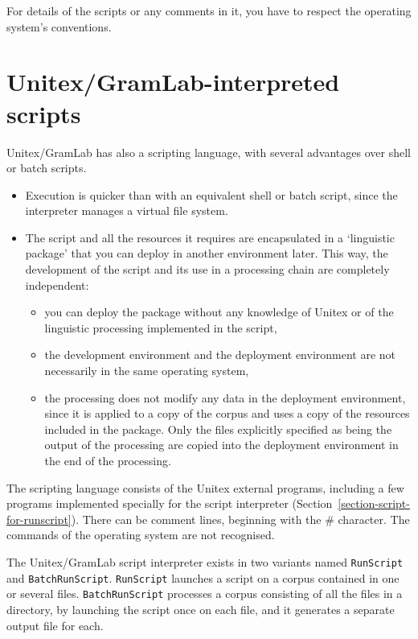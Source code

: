 \noindent For details of the scripts or any comments in it, you have to respect the operating system's
 conventions.



\section{Unitex/GramLab-interpreted scripts}
\label{section-unitex-scripts}

Unitex/GramLab has also a scripting language, with several advantages over shell or batch
scripts.
\begin{itemize}
    \item Execution is quicker than with an equivalent shell or batch script, since the interpreter manages a
virtual file system.
    \item The script and all the resources it requires are encapsulated in a `linguistic package'
    that you can deploy in another environment later. This way, the development of the script and its
    use in a processing chain are completely independent:
\begin{itemize}
    \item you can deploy the package without any knowledge of Unitex or of the linguistic processing
    implemented in the script,
    \item the development environment and the deployment environment are not necessarily
    in the same operating system,
    \item the processing does not modify any data in the deployment environment, since it is applied
    to a copy of the corpus and uses a copy of the resources included in the package. Only the files
explicitly specified as being the output of the processing are copied into the deployment environment in the end 
of the processing.
\end{itemize}
\end{itemize}

\noindent The scripting language consists of the Unitex external programs, including
a few programs implemented specially for the script interpreter 
(Section~\ref{section-script-for-runscript}). There can be comment lines, beginning with 
the  \# character. The commands of the operating system are not recognised.

\bigskip{}
\noindent The Unitex/GramLab script interpreter exists in two variants named \verb$RunScript$ and
\verb$BatchRunScript$. \verb$RunScript$ launches a script on a corpus contained in one or several files.
\verb$BatchRunScript$ processes a corpus consisting of all the files in a directory,
by launching the script once on each file, and it generates a separate output file for each.




